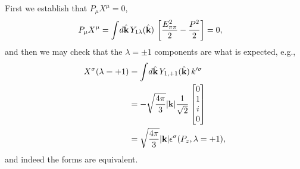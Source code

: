 {\raul  First we establish that $P_\mu X^\mu = 0$,
\begin{align}
	P_\mu X^\mu 
 	&= \int \! d\hat{\mathbf{k}} \, Y_{1\lambda}(\hat{\mathbf{k}})\, \left[ \frac{E_{\pi\pi}^2}{2}  - \frac{P^2}{2} \right] = 0,
\end{align}
and then we may check that the $\lambda=\pm 1$ components are what is expected, e.g.,
\begin{align}
	X^\sigma(\lambda = +1) &= \int \! d\hat{\mathbf{k}} \, Y_{1,+1}(\hat{\mathbf{k}})\, k'^\sigma \nonumber\\
	&= -\sqrt{\frac{4\pi}{3}} |\textbf{k}| \frac{1}{\sqrt{2}} \begin{bmatrix}
		0 \\ 1 \\ i \\ 0
	\end{bmatrix}\nonumber\\
	&= \sqrt{\frac{4\pi}{3}} |\textbf{k}| \epsilon^\sigma(P_z,\lambda=+1),
\end{align}
and indeed the forms are equivalent. 

}



